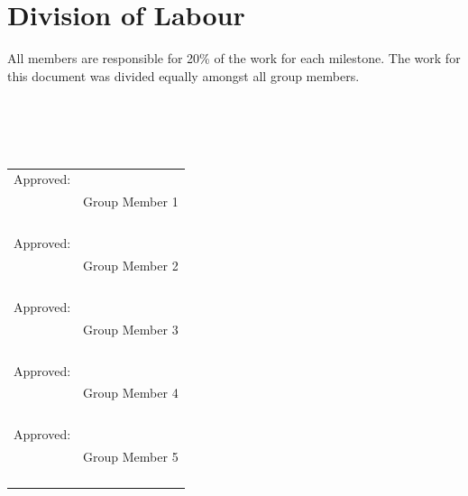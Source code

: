 \documentclass[]{article}
\begin{document}
\section{Division of Labour}
\label{sec:division_of_labour}
All members are responsible for 20\% of the work for each milestone.  The work for this document was divided equally amongst all group members.\\
\\\\\\\\
\begin{tabular}{@{}p{.5in}p{4in}@{}}
Approved: & \hrulefill \\
& Group Member 1 \\\\\\\\\\
Approved: & \hrulefill \\
& Group Member 2 \\\\\\\\\\
Approved: & \hrulefill \\
& Group Member 3 \\\\\\\\\\
Approved: & \hrulefill \\
& Group Member 4 \\\\\\\\\\
Approved: & \hrulefill \\
& Group Member 5 \\\\\\\\\\
\end{tabular}
\end{document}
